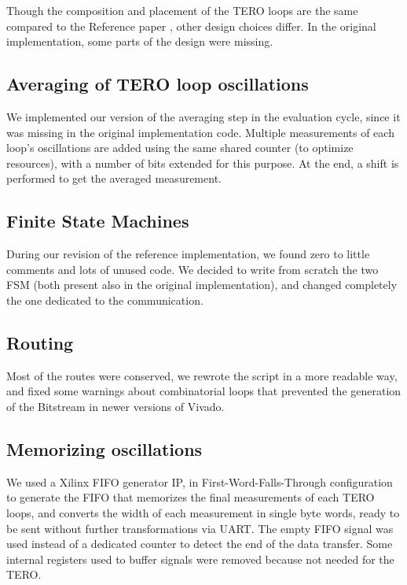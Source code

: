 Though the composition and placement of the TERO loops are the same compared to 
the Reference paper \cite{ref_pap}, other design choices differ.
In the original implementation, some parts of the design were missing.

\subsection{Averaging of TERO loop oscillations}
We implemented our version of the averaging step in the evaluation cycle, 
since it was missing in the original implementation code.
Multiple measurements of each loop's oscillations are added using the same shared counter 
(to optimize resources), with a number of bits extended for this purpose. 
At the end, a shift is performed to get the averaged measurement.

\subsection{Finite State Machines}
During our revision of the reference implementation, we found zero to little comments and 
lots of unused code.
We decided to write from scratch the two FSM (both present also in the original implementation),
and changed completely the one dedicated to the communication.

\subsection{Routing}
Most of the routes were conserved, we rewrote the script in a more readable way, and fixed some
warnings about combinatorial loops that prevented the generation of the Bitstream 
in newer versions of Vivado.

\subsection{Memorizing oscillations}
We used a Xilinx FIFO generator IP, in First-Word-Falls-Through configuration to generate the FIFO
that memorizes the final measurements of each TERO loops, and converts the width of each
measurement in single byte words, ready to be sent without further transformations via UART.
The empty FIFO signal was used instead of a dedicated counter to detect the end of the data transfer.
Some internal registers used to buffer signals were removed because not needed for the TERO.